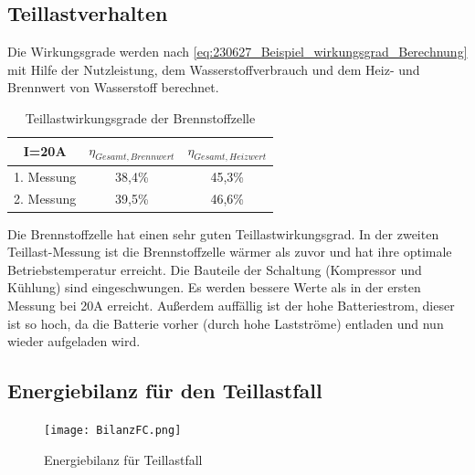 \subsection{}




\subsection{Teillastverhalten}

Die Wirkungsgrade werden nach \autoref{eq:230627_Beispiel_wirkungsgrad_Berechnung} mit Hilfe der Nutzleistung, dem Wasserstoffverbrauch und dem Heiz- und Brennwert von Wasserstoff berechnet. 

\begin{table}[H]
    \caption{Teillastwirkungsgrade der Brennstoffzelle}
    \centering
        \begin{tabular}[pos]{|c|c|c|}
            \hline
            \rowcolor[HTML]{70AD47} 
            I=20A   & $\eta_{Gesamt,Brennwert}$               & $\eta_{Gesamt,Heizwert}$   \\\hline\hline
            1. Messung  & 38,4\%                            & 45,3\%                            \\ \hline
            2. Messung  & 39,5\%                            & 46,6\%                            \\\hline
        \end{tabular}
        \label{tab:20230628_Teillastwirkungsgrade}
\end{table}

Die Brennstoffzelle hat einen sehr guten Teillastwirkungsgrad. In der zweiten Teillast-Messung ist die Brennstoffzelle wärmer als zuvor und hat ihre optimale Betriebstemperatur erreicht. Die Bauteile der Schaltung (Kompressor und Kühlung) sind eingeschwungen. Es werden bessere Werte als in der ersten Messung bei 20A erreicht. Außerdem auffällig ist der hohe Batteriestrom, dieser ist so hoch, da die Batterie vorher (durch hohe Lastströme) entladen und nun wieder aufgeladen wird. 

\newpage
\subsection{Energiebilanz für den Teillastfall}

\begin{figure}[H]
  \texttt{[image: BilanzFC.png]}
\caption{Energiebilanz für Teillastfall}
\label{fig:20230630_Energiebilanz}
\end{figure}

